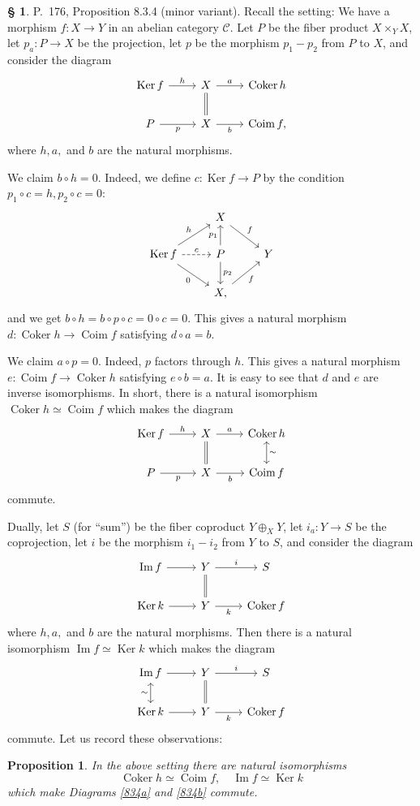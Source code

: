 \documentclass[12pt]{article}
\newtheorem{prop}[thm]{Proposition}
\theoremstyle{remark}
\theoremstyle{definition}
\newtheorem{s}[thm]{\S}
\newcommand{\C}{\mathcal C}
\newcommand{\mv}{ (minor variant)}
\DeclareMathOperator{\Coim}{Coim}
\DeclareMathOperator{\Coker}{Coker}
\DeclareMathOperator{\Ima}{Im}
\DeclareMathOperator{\Ker}{Ker}
\begin{document}
\begin{s}%
P.~176, Proposition 8.3.4\mv. Recall the setting: We have a morphism $f:X\to Y$ in an abelian category $\C$. Let $P$ be the fiber product $X\times_YX$, let $p_a:P\to X$ be the projection, let $p$ be the morphism $p_1-p_2$ from $P$ to $X$, and consider the diagram 
%
$$
\begin{tikzcd}
\Ker f\ar{r}{h}&X\ar[equal]{d}\ar{r}{a}&\Coker h\\ 
P\ar{r}[swap]{p}&X\ar{r}[swap]{b}&\Coim f,
\end{tikzcd}
$$ 
where $h,a,$ and $b$ are the natural morphisms. 

We claim $b\circ h=0$. Indeed, we define $c:\Ker f\to P$ by the condition $p_1\circ c=h,p_2\circ c=0$: 
$$
\begin{tikzcd}
{}&X\ar{dr}{f}\\ 
\Ker f\ar{ur}{h}\ar{dr}[swap]{0}\ar[dashed]{r}{c}&P\ar{u}{p_1}\ar{d}{p_2}&Y\\ 
{}&X\ar{ur}[swap]{f},
\end{tikzcd}
$$
and we get $b\circ h=b\circ p\circ c=0\circ c=0$. This gives a natural morphism $d:\Coker h\to\Coim f$ satisfying $d\circ a=b$. 

We claim $a\circ p=0$. Indeed, $p$ factors through $h$. This gives a natural morphism $e:\Coim f\to\Coker h$ satisfying $e\circ b=a$. It is easy to see that $d$ and $e$ are inverse isomorphisms. In short, there is a natural isomorphism $\Coker h\simeq\Coim f$ which makes the diagram
%
\begin{equation}\label{834a}
\begin{tikzcd}
\Ker f\ar{r}{h}&X\ar[equal]{d}\ar{r}{a}&\Coker h\ar[leftrightarrow]{d}{\sim}\\ 
P\ar{r}[swap]{p}&X\ar{r}[swap]{b}&\Coim f
\end{tikzcd}
\end{equation}
%
commute. 

Dually, let $S$ (for ``sum'') be the fiber coproduct $Y\oplus_XY$, let $i_a:Y\to S$ be the coprojection, let $i$ be the morphism $i_1-i_2$ from $Y$ to $S$, and consider the diagram 
%
$$
\begin{tikzcd}
\Ima f\ar{r}&Y\ar[equal]{d}\ar{r}{i}&S\\ 
\Ker k\ar{r}&Y\ar{r}[swap]{k}&\Coker f
\end{tikzcd}
$$ 
where $h,a,$ and $b$ are the natural morphisms. Then there is a natural isomorphism $\Ima f\simeq\Ker k$ which makes the diagram 
%
\begin{equation}\label{834b}
\begin{tikzcd}
\Ima f\ar[leftrightarrow]{d}[swap]{\sim}\ar{r}&Y\ar[equal]{d}\ar{r}{i}&S\\ 
\Ker k\ar{r}&Y\ar{r}[swap]{k}&\Coker f
\end{tikzcd}
\end{equation}
%
commute. Let us record these observations:
\begin{prop}\label{p834}
In the above setting there are natural isomorphisms 
$$
\Coker h\simeq\Coim f,\quad\Ima f\simeq\Ker k
$$ 
which make Diagrams \eqref{834a} and \eqref{834b} commute.
\end{prop}
\end{s}
\end{document}
